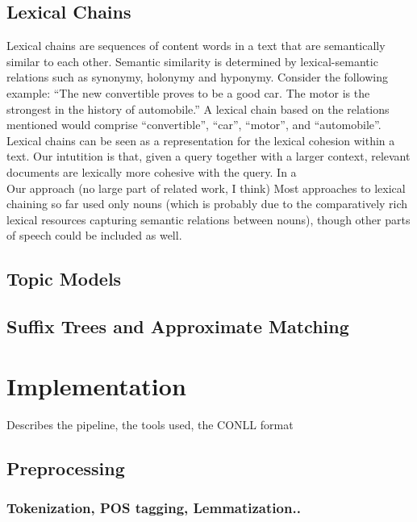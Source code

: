 \documentclass[11pt, a4paper, abstraction]{scrartcl}
\begin{document}
\subsection{Lexical Chains}

Lexical chains are sequences of content words in a text that are semantically similar to each other. Semantic similarity is determined by lexical-semantic relations such as synonymy, holonymy and hyponymy. Consider the following example: ``The new convertible proves to be a good car. The motor is the strongest in the history of automobile.''
A lexical chain based on the relations mentioned would comprise ``convertible'', ``car'', ``motor'', and ``automobile''. Lexical chains can be seen as a representation for the lexical cohesion within a text. Our intutition is that, given a query together with a larger context, relevant documents are lexically more cohesive with the query. In a \\
Our approach (no large part of related work, I think)
Most approaches to lexical chaining so far used only nouns (which is probably due to the comparatively rich lexical resources capturing semantic relations between nouns), though other parts of speech could be included as well. \\ 



\subsection{Topic Models}

\subsection{Suffix Trees and Approximate Matching}

\section{Implementation}

Describes the pipeline, the tools used, the CONLL format

\subsection{Preprocessing}

\subsubsection{Tokenization, POS tagging, Lemmatization..}
\end{document}
